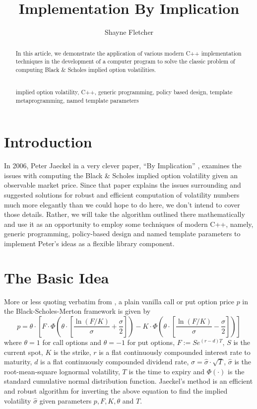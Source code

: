\documentclass[a4paper,twoside,twocolumn]{article}
\title{Implementation By Implication}
\begin{document}
\author{Shayne Fletcher}
\date{}
\maketitle

\tiny

\begin{abstract}
In this article, we demonstrate the application of various modern C++
implementation techniques in the development of a computer program to
solve the classic problem of computing Black \& Scholes implied option
volatilities.\\
\\
\begin{keywords}implied option volatility, C++, generic programming,
policy based design, template metaprogramming, named template
parameters
\end{keywords}
\end{abstract}

\section{Introduction}
In 2006, Peter Jaeckel in a very clever paper, ``By Implication''
\citep{jaeckel06}, examines the issues with computing the Black \&
Scholes implied option volatility given an observable market price.
Since that paper explains the issues surrounding and suggested
solutions for robust and efficient computation of volatility numbers
much more elegantly than we could hope to do here, we don't intend to
cover those details. Rather, we will take the algorithm outlined there
mathematically and use it as an opportunity to employ some techniques
of modern C++, namely, generic programming, policy-based design and
named template parameters to implement Peter's ideas as a flexible
library component.

\section{The Basic Idea}
More or less quoting verbatim from \citep{jaeckel06},
a plain vanilla call or put option price $p$ in the
Black-Scholes-Merton \citep{BS73, Mer73} framework is given by
\[p = \theta \cdot \left[ F \cdot \Phi\left( \theta \cdot
\left[ \frac{\ln \left( F/K \right)}{\sigma} +
\frac{\sigma}{2}\right] \right) - K \cdot \Phi\left( \theta \cdot
\left[ \frac{\ln \left( F/K \right)}{\sigma} - \frac{\sigma}{2}
\right] \right) \right]
\]
where $\theta = 1$ for call options and $\theta = -1$ for put options,
$F := Se^{\left( r-d \right)T}$, $S$ is the current spot, $K$ is the
strike, $r$ is a flat continuously compounded interest rate to
maturity, $d$ is a flat continuously compounded dividend rate, $\sigma
= \hat{\sigma} \cdot \sqrt{T}$, $\hat{\sigma}$ is the root-mean-square
lognormal volatility, $T$ is the time to expiry and $\Phi(\cdot)$ is
the standard cumulative normal distribution function. Jaeckel's method
is an efficient and robust algorithm for inverting the above equation
to find the implied volatility $\hat{\sigma}$ given parameters $p, F,
K, \theta$ and $T$.
\end{document}
